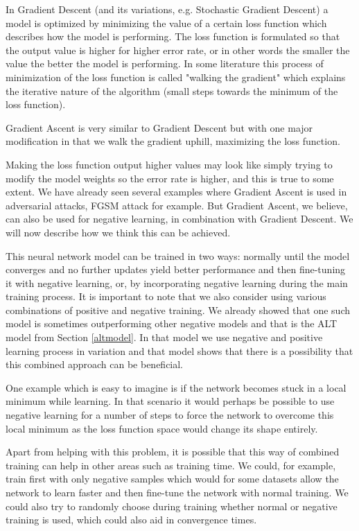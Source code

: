 \documentclass[b5paper]{book}
\begin{document}
In Gradient Descent (and its variations, e.g. Stochastic Gradient Descent) a model is optimized by minimizing the value of a certain loss function which describes how the model is performing. The loss function is formulated so that the output value is higher for higher error rate, or in other words the smaller the value the better the model is performing. In some literature this process of minimization of the loss function is called "walking the gradient" which explains the iterative nature of the algorithm (small steps towards the minimum of the loss function).

Gradient Ascent is very similar to Gradient Descent but with one major modification in that we walk the gradient uphill, maximizing the loss function. 

Making the loss function output higher values may look like simply trying to modify the model weights so the error rate is higher, and this is true to some extent. We have already seen several examples where Gradient Ascent is used in adversarial attacks, FGSM attack for example. But Gradient Ascent, we believe, can also be used for negative learning, in combination with Gradient Descent. We will now describe how we think this can be achieved.

This neural network model can be trained in two ways: normally until the model converges and no further updates yield better performance and then fine-tuning it with negative learning, or, by incorporating negative learning during the main training process. It is important to note that we also consider using various combinations of positive and negative training. We already showed that one such model is sometimes outperforming other negative models and that is the ALT model from Section \ref{altmodel}. In that model we use negative and positive learning process in variation and that model shows that there is a possibility that this combined approach can be beneficial. 

One example which is easy to imagine is if the network becomes stuck in a local minimum while learning. In that scenario it would perhaps be possible to use negative learning for a number of steps to force the network to overcome this local minimum as the loss function space would change its shape entirely. 

Apart from helping with this problem, it is possible that this way of combined training can help in other areas such as training time. We could, for example, train first with only negative samples which would for some datasets allow the network to learn faster and then fine-tune the network with normal training. We could also try to randomly choose during training whether normal or negative training is used, which could also aid in convergence times. 
\end{document}

